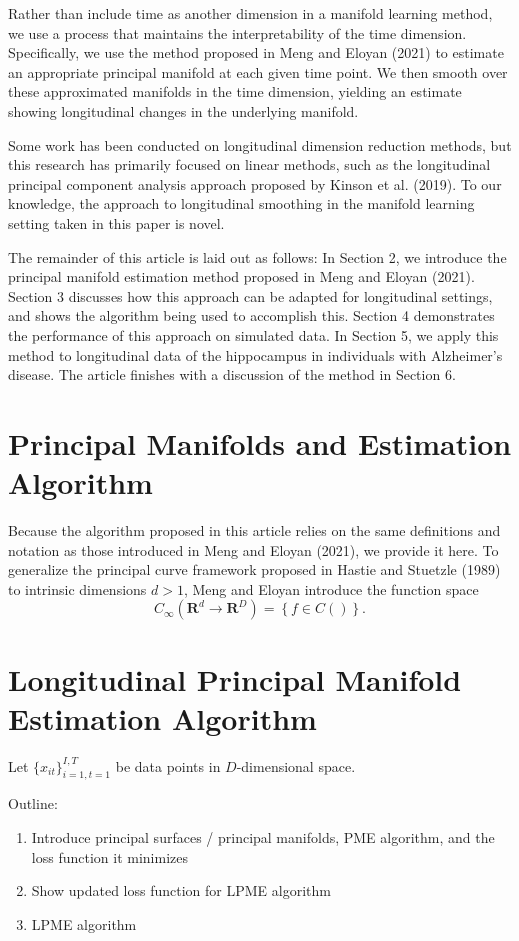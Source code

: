\documentclass[11pt,reqno]{article}
\begin{document}
Rather than include time as another dimension in a manifold learning method, we use a process that maintains the interpretability of the time dimension. Specifically, we use the method proposed in Meng and Eloyan (2021) to estimate an appropriate principal manifold at each given time point. We then smooth over these approximated manifolds in the time dimension, yielding an estimate showing longitudinal changes in the underlying manifold.

Some work has been conducted on longitudinal dimension reduction methods, but this research has primarily focused on linear methods, such as the longitudinal principal component analysis approach proposed by Kinson et al. (2019). To our knowledge, the approach to longitudinal smoothing in the manifold learning setting taken in this paper is novel.

The remainder of this article is laid out as follows: In Section 2, we introduce the principal manifold estimation method proposed in Meng and Eloyan (2021). Section 3 discusses how this approach can be adapted for longitudinal settings, and shows the algorithm being used to accomplish this. Section 4 demonstrates the performance of this approach on simulated data. In Section 5, we apply this method to longitudinal data of the hippocampus in individuals with Alzheimer's disease. The article finishes with a discussion of the method in Section 6.

\section{Principal Manifolds and Estimation Algorithm}

Because the algorithm proposed in this article relies on the same definitions and notation as those introduced in Meng and Eloyan (2021), we provide it here. To generalize the principal curve framework proposed in Hastie and Stuetzle (1989) to intrinsic dimensions $d > 1$, Meng and Eloyan introduce the function space 
\[%
  C_{\infty}(\mathbf{R}^d \to \mathbf{R}^D) = \left\{f \in C()\right\}
.\]%

\section{Longitudinal Principal Manifold Estimation Algorithm}

Let $\{x_{it}\}_{i=1, t=1}^{I, T}$ be data points in $D$-dimensional space.

Outline:
\begin{enumerate}
    \item Introduce principal surfaces / principal manifolds, PME algorithm, and the loss function it minimizes
    \item Show updated loss function for LPME algorithm
    \item LPME algorithm
\end{enumerate}
\end{document}
